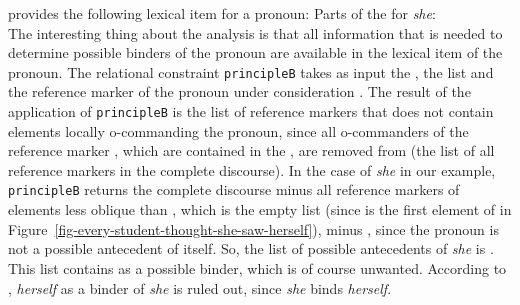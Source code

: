 \documentclass[output=paper,biblatex,babelshorthands,newtxmath,draftmode,colorlinks,citecolor=brown]{langscibook}
\begin{document}
\citet[]{Branco2002a} provides the following lexical item for a pronoun:
\eas
Parts of the \synsemv for \emph{she}:\\
\zs
The interesting thing about the analysis is that all information that is needed to determine
possible binders of the pronoun are available in the lexical item of the pronoun. The relational
constraint \texttt{principleB} takes as input the \listal {}, the \listu list  and the reference marker
of the pronoun under consideration . The result of the application of \texttt{principleB} is the list
of reference markers that does not contain elements locally o-commanding the pronoun, since all
o-commanders of the reference marker , which are contained in the \lista, are removed from \listu (the
list of all reference markers in the complete discourse). In the case of \emph{she} in our example,
\texttt{principleB} returns the complete discourse  minus all reference markers of elements less oblique than , which is the empty
list (since  is the first element of  in
Figure~\ref{fig-every-student-thought-she-saw-herself}), minus , since the pronoun is not a
possible antecedent of itself. So, the list of possible antecedents of \emph{she} is . This list contains  as a possible binder, which
is of course unwanted. According to \citet[]{Branco2002a}, \emph{herself} as a binder of
\emph{she} is ruled out, since \emph{she} binds \emph{herself}.
\end{document}
